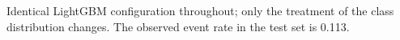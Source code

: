 {\footnotesize Identical LightGBM configuration throughout; only the treatment of the class distribution changes. The observed event rate in the test set is 0.113.}
